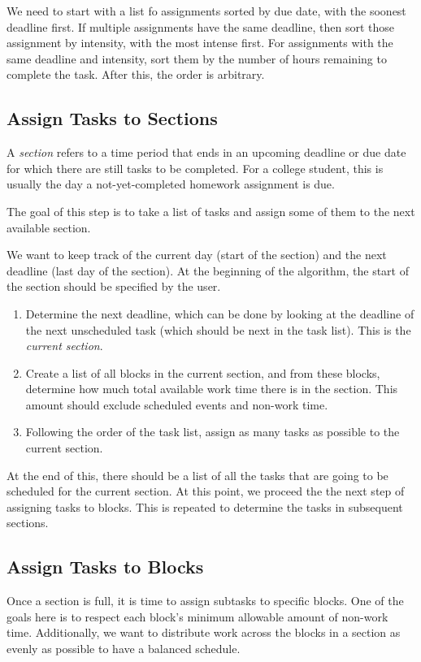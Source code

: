 \documentclass{article}
\begin{document}
	We need to start with a list fo assignments sorted by due date, with the soonest deadline first.
	If multiple assignments have the same deadline, then sort those assignment by intensity, with the most intense first.
	For assignments with the same deadline and intensity, sort them by the number of hours remaining to complete the task.
	After this, the order is arbitrary.

	\subsection{Assign Tasks to Sections}
		A \textit{section} refers to a time period that ends in an upcoming deadline or due date for which there are still tasks to be completed.
		For a college student, this is usually the day a not-yet-completed homework assignment is due.
		
		The goal of this step is to take a list of tasks and assign some of them to the next available section.
		
		We want to keep track of the current day (start of the section) and the next deadline (last day of the section).
		At the beginning of the algorithm, the start of the section should be specified by the user.
		\begin{enumerate}
			\item 
				Determine the next deadline, which can be done by looking at the deadline of the next unscheduled task (which should be next in the task list). This is the \emph{current section}.
			\item 
				Create a list of all blocks in the current section, and from these blocks, determine how much total available work time there is in the section.
				This amount should exclude scheduled events and non-work time.
			\item
				Following the order of the task list, assign as many tasks as possible to the current section.
		\end{enumerate}
		At the end of this, there should be a list of all the tasks that are going to be scheduled for the current section.
		At this point, we proceed the the next step of assigning tasks to blocks.
		This is repeated to determine the tasks in subsequent sections.
		
	\subsection{Assign Tasks to Blocks}
		Once a section is full, it is time to assign subtasks to specific blocks.
		One of the goals here is to respect each block's minimum allowable amount of non-work time.
		Additionally, we want to distribute work across the blocks in a section as evenly as possible to have a balanced schedule.
		
\end{document}
